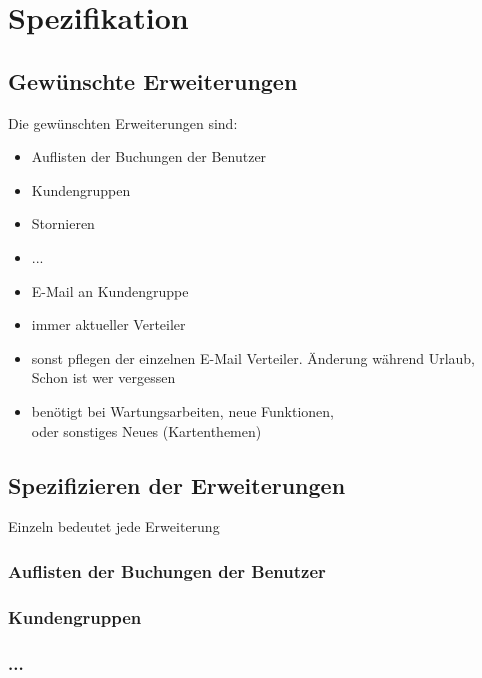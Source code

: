 \chapter{Spezifikation}
\section{Gewünschte Erweiterungen}
Die gewünschten Erweiterungen sind:
\begin{itemize}
	\item Auflisten der Buchungen der Benutzer
	\item Kundengruppen
	\item Stornieren
	\item ...
\end{itemize}

\begin{itemize}
	\item E-Mail an Kundengruppe
	\item immer aktueller Verteiler
	\item sonst pflegen der einzelnen E-Mail Verteiler. Änderung während Urlaub, Schon ist wer vergessen
	\item benötigt bei Wartungsarbeiten, neue Funktionen,\\ oder sonstiges Neues (Kartenthemen)
\end{itemize}

\section{Spezifizieren der Erweiterungen}
Einzeln bedeutet jede Erweiterung
\subsection{Auflisten der Buchungen der Benutzer}
\subsection{Kundengruppen}
\subsection{...}

